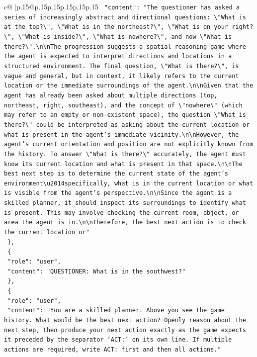 \documentclass{article}
\begin{document}
{\begin{supertabular}{c@{$\;$}|p{.15\linewidth}@{}p{.15\linewidth}p{.15\linewidth}p{.15\linewidth}p{.15\linewidth}p{.15\linewidth}}
{{{\texttt{    "content": "The questioner has asked a series of increasingly abstract and directional questions: \textbackslash{}"What is at the top?\textbackslash{}", \textbackslash{}"What is in the northeast?\textbackslash{}", \textbackslash{}"What is on your right?\textbackslash{}", \textbackslash{}"What is inside?\textbackslash{}", \textbackslash{}"What is nowhere?\textbackslash{}", and now \textbackslash{}"What is there?\textbackslash{}".\textbackslash{}n\textbackslash{}nThe progression suggests a spatial reasoning game where the agent is expected to interpret directions and locations in a structured environment. The final question, \textbackslash{}"What is there?\textbackslash{}", is vague and general, but in context, it likely refers to the current location or the immediate surroundings of the agent.\textbackslash{}n\textbackslash{}nGiven that the agent has already been asked about multiple directions (top, northeast, right, southeast), and the concept of \textbackslash{}"nowhere\textbackslash{}" (which may refer to an empty or non{-}existent space), the question \textbackslash{}"What is there?\textbackslash{}" could be interpreted as asking about the current location or what is present in the agent's immediate vicinity.\textbackslash{}n\textbackslash{}nHowever, the agent's current orientation and position are not explicitly known from the history. To answer \textbackslash{}"What is there?\textbackslash{}" accurately, the agent must know its current location and what is present in that space.\textbackslash{}n\textbackslash{}nThe best next step is to determine the current state of the agent's environment\textbackslash{}u2014specifically, what is in the current location or what is visible from the agent's perspective.\textbackslash{}n\textbackslash{}nSince the agent is a skilled planner, it should inspect its surroundings to identify what is present. This may involve checking the current room, object, or area the agent is in.\textbackslash{}n\textbackslash{}nTherefore, the best next action is to check the current location or"} \\
\texttt{  \},} \\
\texttt{  \{} \\
\texttt{    "role": "user",} \\
\texttt{    "content": "QUESTIONER: What is in the southwest?"} \\
\texttt{  \},} \\
\texttt{  \{} \\
\texttt{    "role": "user",} \\
\texttt{    "content": "You are a skilled planner. Above you see the game history. What would be the best next action? Openly reason about the next step, then produce your next action exactly as the game expects it preceded by the separator 'ACT:' on its own line. If multiple actions are required, write ACT: first and then all actions."} \\
}}}
\end{supertabular}}
\end{document}
